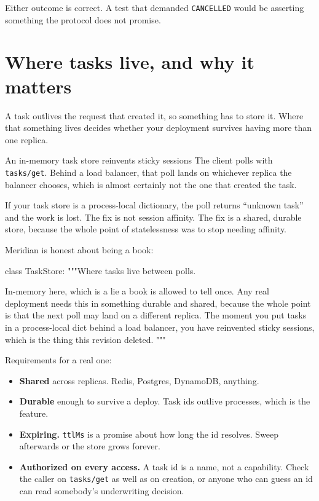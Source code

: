 Either outcome is correct. A test that demanded \texttt{CANCELLED} would be
asserting something the protocol does not promise.

\section{Where tasks live, and why it matters}

A task outlives the request that created it, so something has to store it. Where
that something lives decides whether your deployment survives having more than
one replica.

\begin{dangerbox}{An in-memory task store reinvents sticky sessions}
The client polls with \texttt{tasks/get}. Behind a load balancer, that poll
lands on whichever replica the balancer chooses, which is almost certainly not
the one that created the task.

If your task store is a process-local dictionary, the poll returns ``unknown
task'' and the work is lost. The fix is not session affinity. The fix is a
shared, durable store, because the whole point of statelessness was to stop
needing affinity.
\end{dangerbox}

Meridian is honest about being a book:

\begin{py}
class TaskStore:
    """Where tasks live between polls.

    In-memory here, which is a lie a book is allowed to tell once. Any real
    deployment needs this in something durable and shared, because the whole
    point is that the next poll may land on a different replica. The moment you
    put tasks in a process-local dict behind a load balancer, you have
    reinvented sticky sessions, which is the thing this revision deleted.
    """
\end{py}

Requirements for a real one:

\begin{itemize}[leftmargin=1.6em, itemsep=3pt]
\item \textbf{Shared} across replicas. Redis, Postgres, DynamoDB, anything.
\item \textbf{Durable} enough to survive a deploy. Task ids outlive processes,
which is the feature.
\item \textbf{Expiring.} \texttt{ttlMs} is a promise about how long the id
resolves. Sweep afterwards or the store grows forever.
\item \textbf{Authorized on every access.} A task id is a name, not a
capability. Check the caller on \texttt{tasks/get} as well as on creation, or
anyone who can guess an id can read somebody's underwriting decision.
\end{itemize}

